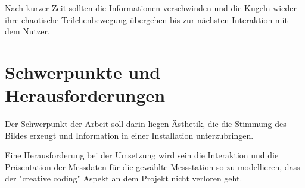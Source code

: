 \documentclass[12pt]{article} %
\begin{document}
Nach kurzer Zeit sollten die Informationen verschwinden und die Kugeln wieder ihre chaotische Teilchenbewegung übergehen bis zur nächsten Interaktion mit dem Nutzer.


\section{Schwerpunkte und Herausforderungen} \label{sec:Schwerpunkte}

Der Schwerpunkt der Arbeit soll darin liegen Ästhetik, die die Stimmung des Bildes erzeugt und Information in einer Installation unterzubringen.

Eine Herausforderung bei der Umsetzung wird sein die Interaktion und die Präsentation der Messdaten für die gewählte Messstation so zu modellieren, dass der "creative coding" Aspekt an dem Projekt nicht verloren geht.  



\end{document}
